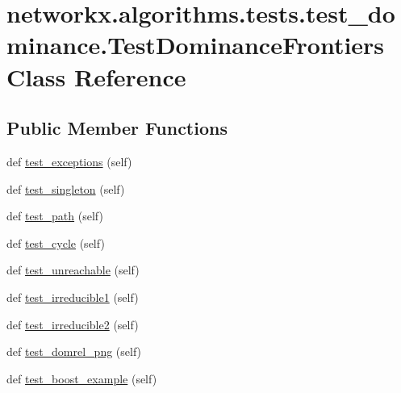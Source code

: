 \hypertarget{classnetworkx_1_1algorithms_1_1tests_1_1test__dominance_1_1TestDominanceFrontiers}{}\section{networkx.\+algorithms.\+tests.\+test\+\_\+dominance.\+Test\+Dominance\+Frontiers Class Reference}
\label{classnetworkx_1_1algorithms_1_1tests_1_1test__dominance_1_1TestDominanceFrontiers}
\subsection*{Public Member Functions}
\begin{DoxyCompactItemize}
\item 
def \hyperlink{classnetworkx_1_1algorithms_1_1tests_1_1test__dominance_1_1TestDominanceFrontiers_aec5a5762257a2e551c1d284d6d965962}{test\+\_\+exceptions} (self)
\item 
def \hyperlink{classnetworkx_1_1algorithms_1_1tests_1_1test__dominance_1_1TestDominanceFrontiers_a73a0fea7d5ce82137ee6a8689f7b82bc}{test\+\_\+singleton} (self)
\item 
def \hyperlink{classnetworkx_1_1algorithms_1_1tests_1_1test__dominance_1_1TestDominanceFrontiers_a9bda3df4e1c6b74394db1b62640f5676}{test\+\_\+path} (self)
\item 
def \hyperlink{classnetworkx_1_1algorithms_1_1tests_1_1test__dominance_1_1TestDominanceFrontiers_acbcf5324ae637627eb510ad7b9c0dc61}{test\+\_\+cycle} (self)
\item 
def \hyperlink{classnetworkx_1_1algorithms_1_1tests_1_1test__dominance_1_1TestDominanceFrontiers_a7b34833b3391fb66e83bd4f14c3c62ca}{test\+\_\+unreachable} (self)
\item 
def \hyperlink{classnetworkx_1_1algorithms_1_1tests_1_1test__dominance_1_1TestDominanceFrontiers_a5b3eb0403b70050b02ad297cab58cc7d}{test\+\_\+irreducible1} (self)
\item 
def \hyperlink{classnetworkx_1_1algorithms_1_1tests_1_1test__dominance_1_1TestDominanceFrontiers_acaee5df7e5b21ea1cbeabe8a03fa4709}{test\+\_\+irreducible2} (self)
\item 
def \hyperlink{classnetworkx_1_1algorithms_1_1tests_1_1test__dominance_1_1TestDominanceFrontiers_aaa7bb9d977a70df08ba04ab07612e652}{test\+\_\+domrel\+\_\+png} (self)
\item 
def \hyperlink{classnetworkx_1_1algorithms_1_1tests_1_1test__dominance_1_1TestDominanceFrontiers_af0060fdad8a3a21ef1632d2355898a02}{test\+\_\+boost\+\_\+example} (self)

\end{DoxyCompactItemize}
